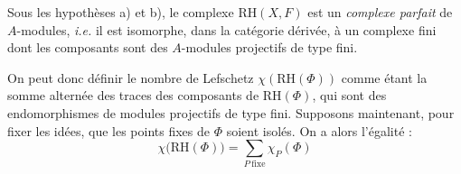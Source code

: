 Sous les hypothèses a) et b), le complexe $\mathrm{RH}(X,F)$ est un
\emph{complexe parfait} de $A$-modules, \emph{i.e.} il est isomorphe, dans la
catégorie dérivée, à un complexe fini dont les composants sont des
$A$-modules projectifs de type fini.

On peut donc définir le nombre de Lefschetz $\chi(\mathrm{RH}(\Phi))$ comme
étant la somme alternée des traces des composants de $\mathrm{RH}(\Phi)$, qui
sont des endomorphismes de modules projectifs de type fini. Supposons
maintenant, pour fixer les idées, que les points fixes de $\Phi$ soient
isolés. On a alors l'égalité :
\begingroup
\makeatletter
\tagsleft@true
\let\veqno\@@leqno
\makeatother
\begin{equation}
\chi\bigl(\mathrm{RH}(\Phi)\bigr)
=\sum_{P\ \mathrm{fixe}}\chi_P(\Phi)
\tag{Lef}
\end{equation}
\endgroup
